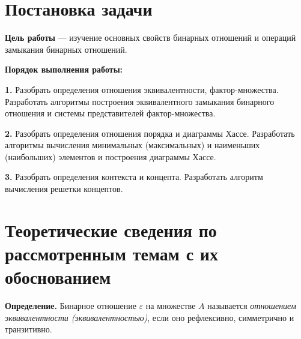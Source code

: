 \documentclass[spec, och, otchet, hidelinks]{SCWorks}
\begin{document}


\tableofcontents






\section{Постановка задачи}

\textbf{Цель работы} — изучение основных свойств бинарных отношений и операций замыкания бинарных
отношений. \\
\par \textbf{Порядок выполнения работы:} 
\par \textbf{1.} Разобрать определения отношения эквивалентности, фактор-множества. Разработать 
алгоритмы построения эквивалентного замыкания бинарного отношения и системы представителей 
фактор-множества. 
\par \textbf{2.} Разобрать определения отношения порядка и диаграммы Хассе. Разработать алгоритмы
вычисления минимальных (максимальных) и наименьших (наибольших) элементов  и построения диаграммы
Хассе. 
\par \textbf{3.} Разобрать определения контекста и концепта. Разработать алгоритм вычисления 
решетки концептов.

\newpage

\section{Теоретические сведения по рассмотренным темам с их обоснованием}

\par \textbf{Определение.} Бинарное отношение $ \varepsilon $ на множестве $ A $ называется 
\textit{отношением эквивалентности (эквивалентностью)}, если оно рефлексивно, симметрично и 
транзитивно. 
\end{document}
